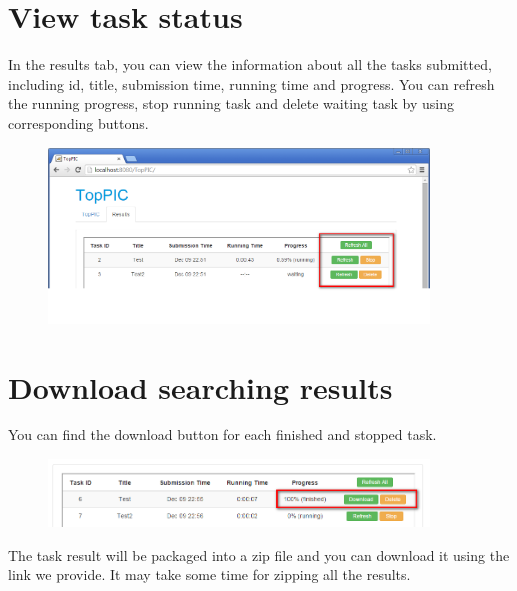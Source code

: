 \documentclass[12pt,letterpaper]{article}
\begin{document}
\section{View task status}

In the results tab, you can view the information about all the tasks submitted,
including id, title, submission time, running time and progress.
You can refresh the running progress, stop running task and delete waiting task
by using corresponding buttons.

\begin{figure}[H]
\begin{center}
    \includegraphics[width=0.9\textwidth]{fig/8.png}
\end{center}
\end{figure}

\section{Download searching results}

You can find the download button for each finished and stopped task.


\begin{figure}[H]
\begin{center}
    \includegraphics[width=0.9\textwidth]{fig/9.png}
\end{center}
\end{figure}

The task result will be packaged into a zip file and you can download it
using the link we provide.
It may take some time for zipping all the results.
\end{document}
